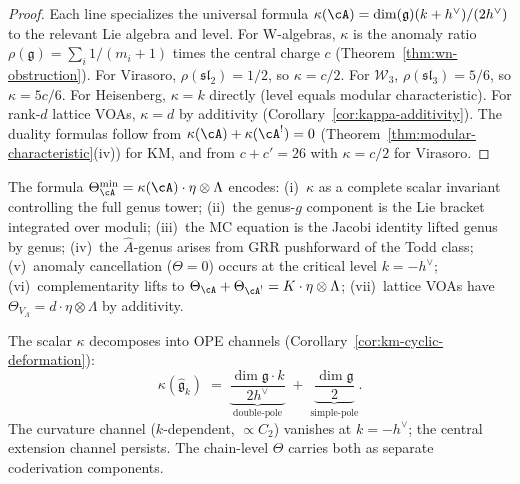 \begin{proof}
Each line specializes the universal formula
$\kappa(\cA) = \dim(\mathfrak{g})(k+h^\vee)/(2h^\vee)$ to the
relevant Lie algebra and level.  For W-algebras, $\kappa$ is
the anomaly ratio $\rho(\mathfrak{g}) = \sum_i 1/(m_i+1)$ times
the central charge $c$
(Theorem~\ref{thm:wn-obstruction}).
For Virasoro, $\rho(\mathfrak{sl}_2) = 1/2$, so $\kappa = c/2$.
For $\mathcal{W}_3$, $\rho(\mathfrak{sl}_3) = 5/6$, so
$\kappa = 5c/6$.  For Heisenberg, $\kappa = k$ directly
(level equals modular characteristic).  For rank-$d$ lattice VOAs,
$\kappa = d$ by additivity
(Corollary~\ref{cor:kappa-additivity}).
The duality formulas follow from $\kappa(\cA) + \kappa(\cA^!) = 0$
(Theorem~\ref{thm:modular-characteristic}(iv)) for KM, and from
$c + c' = 26$ with $\kappa = c/2$ for Virasoro.
\end{proof}

\begin{remark}
\label{rem:theta-interpretation}
The formula $\Theta_{\cA}^{\min} = \kappa(\cA)\cdot\eta\otimes\Lambda$
encodes: (i)~$\kappa$ as a complete scalar invariant controlling the
full genus tower; (ii)~the genus-$g$ component is the Lie bracket
integrated over moduli; (iii)~the MC equation is the Jacobi identity
lifted genus by genus; (iv)~the $\hat{A}$-genus arises from GRR
pushforward of the Todd class; (v)~anomaly cancellation ($\Theta=0$)
occurs at the critical level $k=-h^\vee$; (vi)~complementarity lifts
to $\Theta_{\cA}+\Theta_{\cA^!}=K\cdot\eta\otimes\Lambda$;
(vii)~lattice VOAs have $\Theta_{V_\Lambda}=d\cdot\eta\otimes\Lambda$
by additivity.
\end{remark}

\begin{remark}
\label{rem:theta-two-channel}
The scalar $\kappa$ decomposes into OPE channels
(Corollary~\ref{cor:km-cyclic-deformation}):
\[
\kappa(\widehat{\mathfrak{g}}_k)
\;=\;
\underbrace{\frac{\dim\mathfrak{g}\cdot k}{2h^\vee}}_{\text{double-pole}}
\;+\;
\underbrace{\frac{\dim\mathfrak{g}}{2}}_{\text{simple-pole}}.
\]
The curvature channel ($k$-dependent, $\propto C_2$) vanishes at
$k=-h^\vee$; the central extension channel persists.
The chain-level $\Theta$ carries both as separate coderivation
components.
\end{remark}

